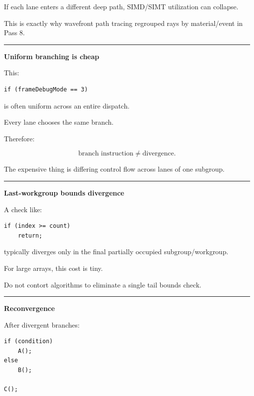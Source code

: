 If each lane enters a different deep path, SIMD/SIMT utilization can collapse.

This is exactly why wavefront path tracing regrouped rays by material/event in Pass 8.

\begin{center}\rule{0.5\linewidth}{0.5pt}\end{center}

\textbf{Uniform branching is cheap}

This:

\protect{}\label{3mrjt7}%
\begin{verbatim}
if (frameDebugMode == 3)
\end{verbatim}

is often uniform across an entire dispatch.

Every lane chooses the same branch.

Therefore:

\[
\boxed{
\text{branch instruction}
\neq
\text{divergence}.
}
\]

The expensive thing is differing control flow across lanes of one subgroup.

\begin{center}\rule{0.5\linewidth}{0.5pt}\end{center}

\textbf{Last-workgroup bounds divergence}

A check like:

\protect{}\label{jynsrg}%
\begin{verbatim}
if (index >= count)
    return;
\end{verbatim}

typically diverges only in the final partially occupied subgroup/workgroup.

For large arrays, this cost is tiny.

Do not contort algorithms to eliminate a single tail bounds check.

\begin{center}\rule{0.5\linewidth}{0.5pt}\end{center}

\textbf{Reconvergence}

After divergent branches:

\protect{}\label{x2i0x6}%
\begin{verbatim}
if (condition)
    A();
else
    B();

C();
\end{verbatim}

